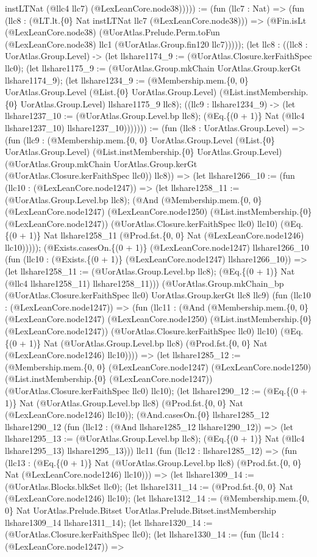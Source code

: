 \documentclass[11pt]{article}
\begin{document}
instLTNat (@llc4 llc7) (@LexLeanCore.node38))))) := (fun (llc7 : Nat) => (fun (llc8 : (@LT.lt.\{0\} Nat instLTNat llc7 (@LexLeanCore.node38))) => (@Fin.isLt (@LexLeanCore.node38) (@UorAtlas.Prelude.Perm.toFun (@LexLeanCore.node38) llc1 (@UorAtlas.Group.fin120 llc7))))); (let llc8 : ((llc8 : UorAtlas.Group.Level) -> (let llshare1174\_9 := (@UorAtlas.Closure.kerFaithSpec llc0); (let llshare1175\_9 := (@UorAtlas.Group.mkChain UorAtlas.Group.kerGt llshare1174\_9); (let llshare1234\_9 := (@Membership.mem.\{0, 0\} UorAtlas.Group.Level (@List.\{0\} UorAtlas.Group.Level) (@List.instMembership.\{0\} UorAtlas.Group.Level) llshare1175\_9 llc8); ((llc9 : llshare1234\_9) -> (let llshare1237\_10 := (@UorAtlas.Group.Level.bp llc8); (@Eq.\{(0 + 1)\} Nat (@llc4 llshare1237\_10) llshare1237\_10))))))) := (fun (llc8 : UorAtlas.Group.Level) => (fun (llc9 : (@Membership.mem.\{0, 0\} UorAtlas.Group.Level (@List.\{0\} UorAtlas.Group.Level) (@List.instMembership.\{0\} UorAtlas.Group.Level) (@UorAtlas.Group.mkChain UorAtlas.Group.kerGt (@UorAtlas.Closure.kerFaithSpec llc0)) llc8)) => (let llshare1266\_10 := (fun (llc10 : (@LexLeanCore.node1247)) => (let llshare1258\_11 := (@UorAtlas.Group.Level.bp llc8); (@And (@Membership.mem.\{0, 0\} (@LexLeanCore.node1247) (@LexLeanCore.node1250) (@List.instMembership.\{0\} (@LexLeanCore.node1247)) (@UorAtlas.Closure.kerFaithSpec llc0) llc10) (@Eq.\{(0 + 1)\} Nat llshare1258\_11 (@Prod.fst.\{0, 0\} Nat (@LexLeanCore.node1246) llc10))))); (@Exists.casesOn.\{(0 + 1)\} (@LexLeanCore.node1247) llshare1266\_10 (fun (llc10 : (@Exists.\{(0 + 1)\} (@LexLeanCore.node1247) llshare1266\_10)) => (let llshare1258\_11 := (@UorAtlas.Group.Level.bp llc8); (@Eq.\{(0 + 1)\} Nat (@llc4 llshare1258\_11) llshare1258\_11))) (@UorAtlas.Group.mkChain\_bp (@UorAtlas.Closure.kerFaithSpec llc0) UorAtlas.Group.kerGt llc8 llc9) (fun (llc10 : (@LexLeanCore.node1247)) => (fun (llc11 : (@And (@Membership.mem.\{0, 0\} (@LexLeanCore.node1247) (@LexLeanCore.node1250) (@List.instMembership.\{0\} (@LexLeanCore.node1247)) (@UorAtlas.Closure.kerFaithSpec llc0) llc10) (@Eq.\{(0 + 1)\} Nat (@UorAtlas.Group.Level.bp llc8) (@Prod.fst.\{0, 0\} Nat (@LexLeanCore.node1246) llc10)))) => (let llshare1285\_12 := (@Membership.mem.\{0, 0\} (@LexLeanCore.node1247) (@LexLeanCore.node1250) (@List.instMembership.\{0\} (@LexLeanCore.node1247)) (@UorAtlas.Closure.kerFaithSpec llc0) llc10); (let llshare1290\_12 := (@Eq.\{(0 + 1)\} Nat (@UorAtlas.Group.Level.bp llc8) (@Prod.fst.\{0, 0\} Nat (@LexLeanCore.node1246) llc10)); (@And.casesOn.\{0\} llshare1285\_12 llshare1290\_12 (fun (llc12 : (@And llshare1285\_12 llshare1290\_12)) => (let llshare1295\_13 := (@UorAtlas.Group.Level.bp llc8); (@Eq.\{(0 + 1)\} Nat (@llc4 llshare1295\_13) llshare1295\_13))) llc11 (fun (llc12 : llshare1285\_12) => (fun (llc13 : (@Eq.\{(0 + 1)\} Nat (@UorAtlas.Group.Level.bp llc8) (@Prod.fst.\{0, 0\} Nat (@LexLeanCore.node1246) llc10))) => (let llshare1309\_14 := (@UorAtlas.Blocks.blkSet llc0); (let llshare1311\_14 := (@Prod.fst.\{0, 0\} Nat (@LexLeanCore.node1246) llc10); (let llshare1312\_14 := (@Membership.mem.\{0, 0\} Nat UorAtlas.Prelude.Bitset UorAtlas.Prelude.Bitset.instMembership llshare1309\_14 llshare1311\_14); (let llshare1320\_14 := (@UorAtlas.Closure.kerFaithSpec llc0); (let llshare1330\_14 := (fun (llc14 : (@LexLeanCore.node1247)) => 
\end{document}
